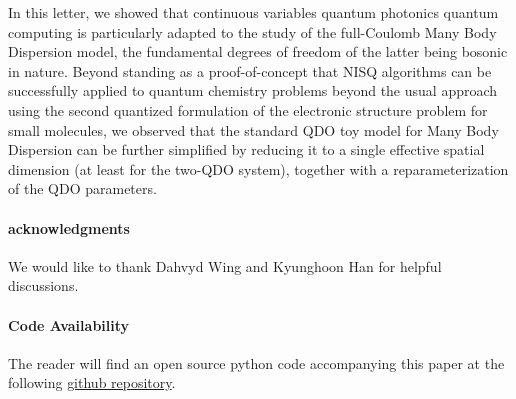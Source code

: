 \documentclass[reprint, amsmath, amssymb, floatfix, aps, pra]{revtex4-2}
\begin{document}
    In this letter, we showed that continuous variables quantum photonics quantum computing is particularly adapted to the study of the full-Coulomb Many Body Dispersion model, the fundamental degrees of freedom of the latter being bosonic in nature. Beyond standing as a proof-of-concept that NISQ algorithms can be successfully applied to quantum chemistry problems beyond the usual approach using the second quantized formulation of the electronic structure problem for small molecules, we observed that the standard QDO toy model for Many Body Dispersion can be further simplified by reducing it to a single effective spatial dimension (at least for the two-QDO system), together with a reparameterization of the QDO parameters.
    \newline

\paragraph*{acknowledgments}

    We would like to thank Dahvyd Wing and Kyunghoon Han for helpful discussions.
    \newline

\paragraph*{Code Availability}

The reader will find an open source python code accompanying this paper at the following \href{https://github.com/MatthieuSarkis/qdo}{github repository}.

\appendix



\end{document}
